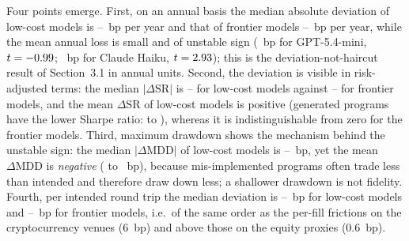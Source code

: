 \documentclass[11pt,a4paper]{article}
\begin{document}
Four points emerge. First, on an annual basis the median absolute deviation of low-cost models is \RevRiskGptAnnMed--\RevRiskQwenSAnnMed~bp per year and that of frontier models \RevRiskOpusAnnMed--\RevRiskDSProAnnMed~bp per year, while the mean annual loss is small and of unstable sign (\RevRiskGptAnnMean~bp for GPT-5.4-mini, $t=-0.99$; \RevRiskHaikuAnnMean~bp for Claude Haiku, $t=2.93$); this is the deviation-not-haircut result of Section~3.1 in annual units. Second, the deviation is visible in risk-adjusted terms: the median $|\Delta\mathrm{SR}|$ is \RevRiskGptDSMed--\RevRiskQwenSDSMed{} for low-cost models against \RevRiskOpusDSMed--\RevRiskDSProDSMed{} for frontier models, and the mean $\Delta\mathrm{SR}$ of low-cost models is positive (generated programs have the lower Sharpe ratio: \RevRiskGptDSMean{} to \RevRiskQwenSDSMean), whereas it is indistinguishable from zero for the frontier models. Third, maximum drawdown shows the mechanism behind the unstable sign: the median $|\Delta\mathrm{MDD}|$ of low-cost models is \RevRiskGptDDMed--\RevRiskQwenSDDMed~bp, yet the mean $\Delta\mathrm{MDD}$ is \emph{negative} (\RevRiskGptDDMean{} to \RevRiskQwenSDDMean~bp), because mis-implemented programs often trade less than intended and therefore draw down less; a shallower drawdown is not fidelity. Fourth, per intended round trip the median deviation is \RevRiskGptTurnMed--\RevRiskQwenSTurnMed~bp for low-cost models and \RevRiskOpusTurnMed--\RevRiskDSProTurnMed~bp for frontier models, i.e.\ of the same order as the per-fill frictions on the cryptocurrency venues (6~bp) and above those on the equity proxies (0.6~bp).
\end{document}
